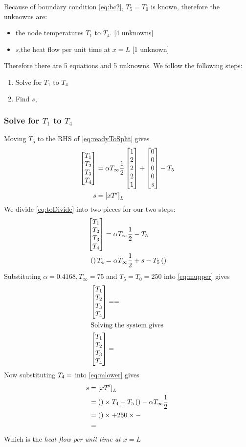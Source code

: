 Because of boundary condition \cref{eq:bc2}, $T_5=T_0$ is known, therefore the
unknowns are:
\begin{itemize}
\item the node temperatures $T_1$ to $T_4$. [4 unknowns]
\item $s$,the heat flow per unit time at $x=L$ [1 unknown]
\end{itemize}
Therefore there are 5 equations and 5 unknowns.
We follow the following steps:
\begin{enumerate}
\item Solve for $T_1$ to $T_4$
\item Find $s$, 
\end{enumerate}
\subsubsection*{Solve for $T_1$ to $T_4$}
Moving $T_5$ to the RHS of \cref{eq:readyToSplit} gives
\def\Tn{\ensuremath{\begin{bmatrix} T_1 \\ T_2 \\ T_3 \\ T_4 \end{bmatrix}}}
\def\alTt{\ensuremath{\alT \frac{1}{2}}}
\def\g#1{\MyGet{#1}}
\begin{align}
  \g{M2} \Tn
    &= \alTt \matb +
    \begin{bmatrix}
      0\\0\\0\\0\\ s
    \end{bmatrix} -
  T_5\g{Me} \label{eq:toDivide}\\
  s&= \eBdri{L} \notag
\end{align}
We divide \cref{eq:toDivide} into two pieces for our two steps:
\begin{align}
  \g{M.upper} \Tn &= \alTt \g{v.top} - T_5 \g{v2.top} \label{eq:mupper}\\
  \prnIt{\g{last.lhs}} T_4 &= \alTt + s  - T_5 \prnIt{\g{last.rhs}} \label{eq:mlower}
\end{align}
Substituting $\alpha = 0.4168, T_{\infty} = 75$ and $T_5 = T_0 = 250$ into
\cref{eq:mupper} gives
\begin{align}
  \g{M.upper.n} \Tn &= \g{rhs.upper} = \g{rhs.upper.n} \notag\\
  \intertext{Solving the system gives}
  \Tn &= \g{T1.T4} \label{eq:resultT}
\end{align}
Now substituting $T_4 = \g{T4.n}$ into \cref{eq:mlower} gives
\begin{align}
  s &= \eBdri{L} \notag\\
    &= \prnIt{\g{last.lhs}} \times T_4 + T_5 \prnIt{\g{last.rhs}} - \alTt \notag\\
    &= \prnIt{\g{last.lhs.n}} \times \g{T4.n} + 250 \times \g{last.rhs.n} - \g{alT2.n} \notag\\
  &= \g{s}
\end{align}
Which is the \emph{heat flow per unit time at $x=L$}
